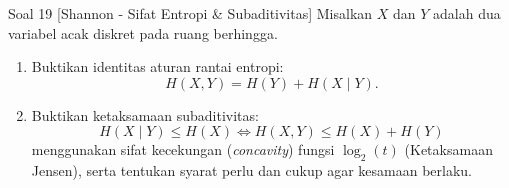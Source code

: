 \documentclass[11pt,a4paper]{article}
\begin{document}
\begin{soalshannon}{Soal 19 [Shannon - Sifat Entropi \& Subaditivitas]}
Misalkan $X$ dan $Y$ adalah dua variabel acak diskret pada ruang berhingga.
\begin{enumerate}[label=(\alph*)]
    \item Buktikan identitas aturan rantai entropi:
    \[
    H(X, Y) = H(Y) + H(X \mid Y).
    \]
    \item Buktikan ketaksamaan subaditivitas:
    \[
    H(X \mid Y) \le H(X) \iff H(X, Y) \le H(X) + H(Y)
    \]
    menggunakan sifat kecekungan (\textit{concavity}) fungsi $\log_2(t)$ (Ketaksamaan Jensen), serta tentukan syarat perlu dan cukup agar kesamaan berlaku.
\end{enumerate}
\end{soalshannon}
\end{document}
